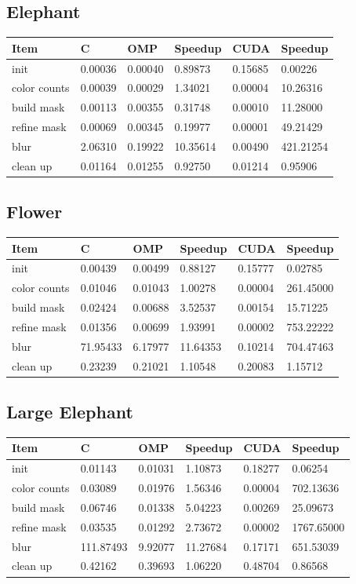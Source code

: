 \documentclass[12pt]{article}
\begin{document}
\subsection{Elephant}
\begin{tabular}{l|l|l|l|l|l}
    Item & C & OMP & Speedup & CUDA & Speedup
\\  \hline
    init & 0.00036 & 0.00040 & 0.89873 & 0.15685 & 0.00226
\\  color counts & 0.00039 & 0.00029 & 1.34021 & 0.00004 & 10.26316
\\  build mask & 0.00113 & 0.00355 & 0.31748 & 0.00010 & 11.28000
\\  refine mask & 0.00069 & 0.00345 & 0.19977 & 0.00001 & 49.21429
\\  blur & 2.06310 & 0.19922 & 10.35614 & 0.00490 & 421.21254
\\  clean up & 0.01164 & 0.01255 & 0.92750 & 0.01214 & 0.95906
\end{tabular}
\subsection{Flower}
\begin{tabular}{l|l|l|l|l|l}
    Item & C & OMP & Speedup & CUDA & Speedup
\\  \hline
    init & 0.00439 & 0.00499 & 0.88127 & 0.15777 & 0.02785
\\  color counts & 0.01046 & 0.01043 & 1.00278 & 0.00004 & 261.45000
\\  build mask & 0.02424 & 0.00688 & 3.52537 & 0.00154 & 15.71225
\\  refine mask & 0.01356 & 0.00699 & 1.93991 & 0.00002 & 753.22222
\\  blur & 71.95433 & 6.17977 & 11.64353 & 0.10214 & 704.47463
\\  clean up & 0.23239 & 0.21021 & 1.10548 & 0.20083 & 1.15712
\end{tabular}
\subsection{Large Elephant}
\begin{tabular}{l|l|l|l|l|l}
    Item & C & OMP & Speedup & CUDA & Speedup
\\  \hline
    init & 0.01143 & 0.01031 & 1.10873 & 0.18277 & 0.06254
\\  color counts & 0.03089 & 0.01976 & 1.56346 & 0.00004 & 702.13636
\\  build mask & 0.06746 & 0.01338 & 5.04223 & 0.00269 & 25.09673
\\  refine mask & 0.03535 & 0.01292 & 2.73672 & 0.00002 & 1767.65000
\\  blur & 111.87493 & 9.92077 & 11.27684 & 0.17171 & 651.53039
\\  clean up & 0.42162 & 0.39693 & 1.06220 & 0.48704 & 0.86568
\end{tabular}
\end{document}
